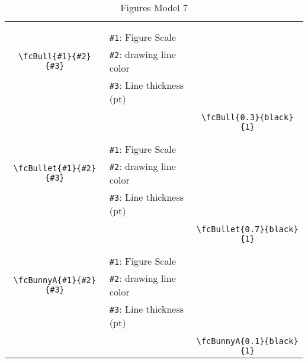 \documentclass[x11names]{article}
\begin{document}
\begin{table}[H]
\begin{tabular}{|c|l|c|}
	&&\multirow{5}{*}{\fcBull{0.3}{black}{1}}\\	&&\\	&\verb|#1|: Figure Scale &\\	\verb|\fcBull{#1}{#2}{#3}|&	\verb|#2|: drawing line color &\\	&\verb|#3|: Line thickness (pt) &\\ &&\\&&	\verb|\fcBull{0.3}{black}{1}|\\\hline 	
	&&\multirow{5}{*}{\fcBullet{0.7}{black}{1}}\\	&&\\	&\verb|#1|: Figure Scale &\\	\verb|\fcBullet{#1}{#2}{#3}|&	\verb|#2|: drawing line color &\\	&\verb|#3|: Line thickness (pt) &\\ &&\\&&	\verb|\fcBullet{0.7}{black}{1}|\\\hline 	
	&&\multirow{5}{*}{\fcBunnyA{0.1}{black}{1}}\\	&&\\	&\verb|#1|: Figure Scale &\\	\verb|\fcBunnyA{#1}{#2}{#3}|&	\verb|#2|: drawing line color &\\	&\verb|#3|: Line thickness (pt) &\\ &&\\&&	\verb|\fcBunnyA{0.1}{black}{1}|\\\hline 	\hline\end{tabular}\caption{Figures Model 7}\label{tab7}\end{table}
\end{document}
